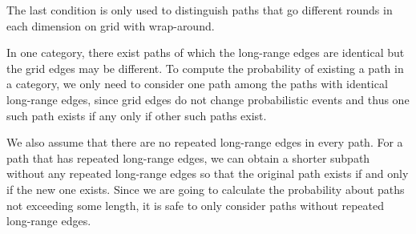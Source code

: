 \documentclass[11pt]{article}
\begin{document}
The last condition is only used to distinguish paths that go different rounds in each dimension on grid with wrap-around.

In one category, there exist paths of which the long-range edges are
	identical but the grid edges may be different.
To compute the probability of existing a path in a category, we only
	need to consider one path among the paths with identical long-range
	edges, since grid edges do not change probabilistic events and thus
	one such path exists if any only if other such paths exist.
	
We also assume that there are no repeated long-range edges in every path. For a path that has repeated long-range edges, we can obtain a shorter subpath without any repeated long-range edges so that the original path exists if and only if the new one exists. Since we are going to calculate the probability about paths not exceeding some length, it is safe to only consider paths without repeated long-range edges.


\end{document}
